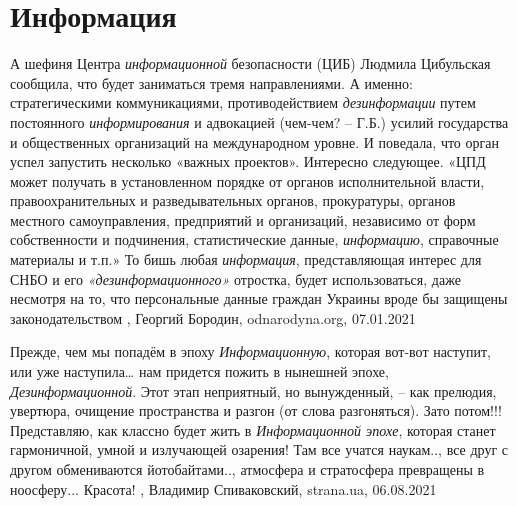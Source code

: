  
 
 
 
 
\chapter{Информация}
\label{sec:slova.informacia}

А  шефиня Центра \emph{информационной} безопасности (ЦИБ) Людмила Цибульская
сообщила, что будет заниматься тремя направлениями. А именно: стратегическими
коммуникациями, противодействием \emph{дезинформации} путем постоянного
\emph{информирования} и адвокацией (чем-чем? – Г.Б.) усилий государства и
общественных организаций на международном уровне. И поведала, что орган успел
запустить несколько «важных проектов».  Интересно следующее. «ЦПД может
получать в установленном порядке от органов исполнительной власти,
правоохранительных и разведывательных органов, прокуратуры, органов местного
самоуправления, предприятий и организаций, независимо от форм собственности и
подчинения, статистические данные, \emph{информацию}, справочные материалы и
т.п.» То бишь любая \emph{информация}, представляющая интерес для СНБО и его
\emph{«дезинформационного»} отростка, будет использоваться, даже несмотря на
то, что персональные данные граждан Украины вроде бы защищены законодательством
, Георгий Бородин, odnarodyna.org, 07.01.2021


Прежде, чем мы попадём в эпоху \emph{Информационную}, которая вот-вот наступит,
или уже наступила… нам придется пожить в нынешней эпохе,
\emph{Дезинформационной}.  Этот этап неприятный, но вынужденный, – как
прелюдия, увертюра, очищение пространства и разгон (от слова разгоняться).
Зато потом!!!  Представляю, как классно будет жить в \emph{Информационной
эпохе}, которая станет гармоничной, умной и излучающей озарения!  Там все
учатся наукам.., все друг с другом обмениваются йотобайтами.., атмосфера и
стратосфера превращены в ноосферу... Красота!
, 
Владимир Спиваковский, strana.ua, 06.08.2021

